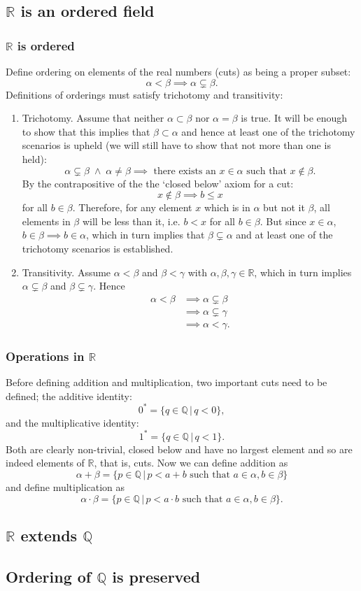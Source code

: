 \documentclass[]{scrartcl}
\theoremstyle{definition}
\newcommand{\bb}[1]{\mathbb{#1}}
\newcommand{\Q}{\bb{Q}}
\newcommand{\R}{\bb{R}}
\newcommand{\AND}{\;\wedge\;}
\begin{document}
\subsection{$\R$ is an ordered field}
\subsubsection{$\R$ is ordered}
Define ordering on elements of the real numbers (cuts) as being a proper subset:
$$
\alpha < \beta \implies \alpha \subsetneq \beta.
$$
Definitions of orderings must satisfy trichotomy and transitivity:
\begin{enumerate}
    \item Trichotomy. Assume that neither $\alpha \subset \beta$ nor $\alpha = \beta$ is true. It will be enough to show that this implies that $\beta \subset \alpha$ and hence at least one of the trichotomy scenarios is upheld (we will still have to show that not more than one is held):
    $$
    \alpha \subsetneq \beta \AND \alpha \neq \beta 
        \implies \text{ there exists an } x \in \alpha \text{ such that } x \notin \beta.
    $$
    By the contrapositive of the the `closed below' axiom for a cut:
    $$
        x \notin \beta \implies b\leq x
    $$
    for all $b \in \beta$. Therefore, for any element $x$ which is in $\alpha$ but not it $\beta$, all elements in $\beta$ will be less than it, i.e. $b<x$ for all $b \in \beta$. But since $x\in\alpha$, $b\in\beta \implies b \in \alpha$, which in turn implies that $\beta \subsetneq \alpha$ and at least one of the trichotomy scenarios is established.
    \item Transitivity. Assume $\alpha < \beta$ and $\beta < \gamma$ with $\alpha, \beta, \gamma \in \R$, which in turn implies $\alpha \subsetneq \beta$ and $\beta \subsetneq \gamma$. Hence
    \begin{align*}
        \alpha < \beta &\implies \alpha \subsetneq \beta \\
        &\implies \alpha \subsetneq \gamma \\
        &\implies \alpha < \gamma.
    \end{align*}
\end{enumerate}
\subsubsection{Operations in $\R$}
Before defining addition and multiplication, two important cuts need to be defined; the additive identity:
$$
0^* = \{q \in \Q\,|\,q<0\},
$$
and the multiplicative identity:
$$
1^* = \{q \in \Q\,|\,q<1\}.
$$
Both are clearly non-trivial, closed below and have no largest element and so are indeed elements of $\R$, that is, cuts. Now we can define addition as
$$
\alpha + \beta = \{p \in \Q\,|\,p<a+b \text{ such that }a\in\alpha, b\in\beta\}
$$
and define multiplication as
$$
\alpha \cdot \beta = \{p \in \Q\,|\,p<a\cdot b \text{ such that }a\in\alpha, b\in\beta\}.
$$

\subsection{$\R$ extends $\Q$}
\subsection{Ordering of $\Q$ is preserved}
\end{document}
